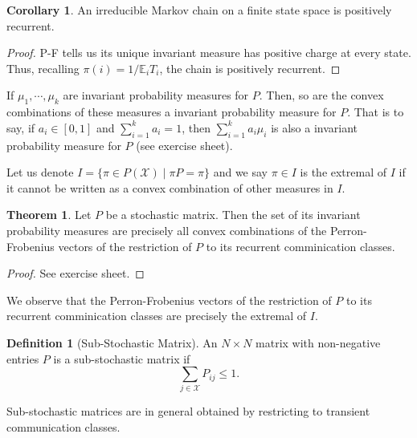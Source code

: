 \documentclass[]{article}
\theoremstyle{definition}
\newtheorem{theorem}{Theorem}
\newtheorem{corollary}{Corollary}[theorem]
\theoremstyle{definition}
\newtheorem{definition}{Definition}[section]
\begin{document}
\begin{corollary}
  An irreducible Markov chain on a finite state space is positively recurrent.
\end{corollary}
\begin{proof}
  P-F tells us its unique invariant measure has positive charge at every state. 
  Thus, recalling \(\pi(i) = 1 / \mathbb{E}_i T_i\), the chain is positively 
  recurrent.
\end{proof}

If \(\mu_1, \cdots, \mu_k\) are invariant probability measures for \(P\). 
Then, so are the convex combinations of these measures a invariant probability 
measure for \(P\). That is to say, if \(a_i \in [0, 1]\) and \(\sum_{i = 1}^k a_i = 1\), 
then \(\sum_{i = 1}^k a_i \mu_i\) is also a invariant probability measure for \(P\)
(see exercise sheet).

Let us denote \(I = \{\pi \in P(\mathcal{X}) \mid \pi P = \pi\}\) and we say 
\(\pi \in I\) is the extremal of \(I\) if it cannot be written as a convex 
combination of other measures in \(I\).

\begin{theorem}
  Let \(P\) be a stochastic matrix. Then the set of its invariant probability 
  measures are precisely all convex combinations of the Perron-Frobenius 
  vectors of the restriction of \(P\) to its recurrent comminication classes. 
\end{theorem}
\begin{proof}
  See exercise sheet.
\end{proof}

We observe that the Perron-Frobenius vectors of the restriction of \(P\) to its 
recurrent comminication classes are precisely the extremal of \(I\).

\begin{definition}[Sub-Stochastic Matrix]
  An \(N \times N\) matrix with non-negative entries \(P\) is a sub-stochastic 
  matrix if 
  \[\sum_{j \in \mathcal{X}} P_{ij} \le 1.\]
\end{definition}

Sub-stochastic matrices are in general obtained by restricting to transient 
communication classes. 
\end{document}
